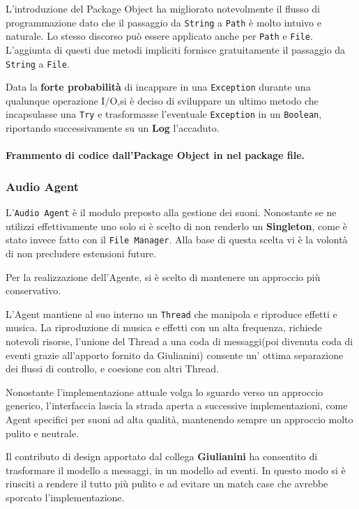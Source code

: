     L'introduzione del Package Object ha migliorato notevolmente il flusso di programmazione dato che il passaggio da \texttt{String} a \texttt{Path} è molto intuivo e naturale. Lo stesso discorso può essere applicato anche per \texttt{Path} e \texttt{File}.
    L'aggiunta di questi due metodi impliciti fornisce gratuitamente il passaggio da \texttt{String} a \texttt{File}.
        
     Data la \textbf{forte probabilità} di incappare in una \texttt{Exception} durante una qualunque operazione I/O,si è deciso di sviluppare un ultimo metodo che incapsulasse una \texttt{Try} e trasformasse l'eventuale  \texttt{Exception} in un \texttt{Boolean}, riportando successivamente su un \textbf{Log} l'accaduto.
     
     
    \paragraph{Frammento di codice dall'Package Object in nel package file.}
    \subsubsection{Audio Agent}
    L'\texttt{Audio Agent} è il modulo preposto alla gestione dei suoni. Nonostante se ne utilizzi effettivamente uno solo si è scelto di non renderlo un \textbf{Singleton}, come è stato invece fatto con il \texttt{File Manager}. 
    Alla base di questa scelta vi è la volontà di non precludere estensioni future.
    
    Per la realizzazione dell'Agente, si è scelto di mantenere un approccio più conservativo. 
    
    L'Agent mantiene al suo interno un \texttt{Thread} che 
    manipola e riproduce effetti e musica.
    La riproduzione di musica e effetti con un alta frequenza, richiede notevoli risorse, l'unione del Thread a una coda di messaggi(poi divenuta coda di eventi grazie all'apporto fornito da Giulianini) consente un' ottima separazione dei flussi di controllo, e coesione con altri Thread.
    
    Nonostante l'implementazione attuale volga lo sguardo verso un approccio generico, l'interfaccia lascia la strada aperta a successive implementazioni, come Agent specifici per suoni ad alta qualità, mantenendo sempre un approccio molto pulito e neutrale.
    
    Il contributo di design apportato dal collega \textbf{Giulianini} ha consentito di trasformare il modello a messaggi, in un modello ad eventi. In questo modo si è riusciti a rendere il tutto più
    pulito e ad evitare un match case
    che avrebbe sporcato l'implementazione.
    
